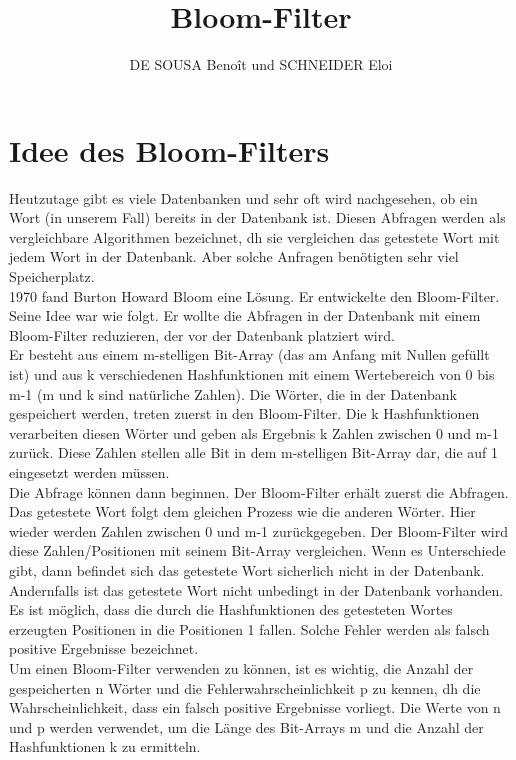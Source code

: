 \documentclass[12pt, letterpaper]{article}
\title{Bloom-Filter}
\author{DE SOUSA Benoît und SCHNEIDER Eloi}
\begin{document}
\maketitle

\section{Idee des Bloom-Filters}
Heutzutage gibt es viele Datenbanken und sehr oft wird nachgesehen, ob ein Wort (in unserem Fall) bereits in der Datenbank ist. Diesen Abfragen werden als vergleichbare Algorithmen bezeichnet, dh sie vergleichen das getestete Wort mit jedem Wort in der Datenbank. Aber solche Anfragen benötigten sehr viel Speicherplatz.\\
1970 fand Burton Howard Bloom eine Lösung. Er entwickelte den Bloom-Filter.\\
Seine Idee war wie folgt. Er wollte die Abfragen in der Datenbank mit einem Bloom-Filter reduzieren, der vor der Datenbank platziert wird.\\
Er besteht aus einem m-stelligen Bit-Array (das am Anfang mit Nullen gefüllt ist) und aus k verschiedenen Hashfunktionen mit einem Wertebereich von 0 bis m-1 (m und k sind natürliche Zahlen). Die Wörter, die in der Datenbank gespeichert werden, treten zuerst in den Bloom-Filter. Die k Hashfunktionen verarbeiten diesen Wörter und geben als Ergebnis k Zahlen zwischen 0 und m-1 zurück. Diese Zahlen stellen alle Bit in dem m-stelligen Bit-Array dar, die auf 1 eingesetzt werden müssen.\\
Die Abfrage können dann beginnen. Der Bloom-Filter erhält zuerst die Abfragen. Das getestete Wort folgt dem gleichen Prozess wie die anderen Wörter. Hier wieder werden Zahlen zwischen 0 und m-1 zurückgegeben. Der Bloom-Filter wird diese Zahlen/Positionen mit seinem Bit-Array vergleichen. Wenn es Unterschiede gibt, dann befindet sich das getestete Wort sicherlich nicht in der Datenbank. Andernfalls ist das getestete Wort nicht unbedingt in der Datenbank vorhanden. Es ist möglich, dass die durch die Hashfunktionen des getesteten Wortes erzeugten Positionen in die Positionen 1 fallen. Solche Fehler werden als falsch positive Ergebnisse bezeichnet.\\
Um einen Bloom-Filter verwenden zu können, ist es wichtig, die Anzahl der gespeicherten n Wörter und die Fehlerwahrscheinlichkeit p zu kennen, dh die Wahrscheinlichkeit, dass ein falsch positive Ergebnisse vorliegt. Die Werte von n und p werden verwendet, um die Länge des Bit-Arrays m und die Anzahl der Hashfunktionen k zu ermitteln.
\end{document}
